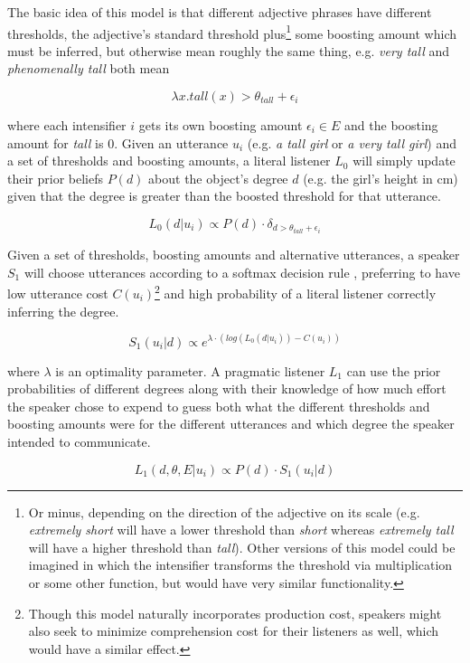 \documentclass[10pt,letterpaper]{article}
\newcommand{\w}[1]{\emph{#1}}
\begin{document}
The basic idea of this model is that different adjective phrases have different thresholds, the adjective's standard threshold plus\footnote{Or minus, depending on the direction of the adjective on its scale (e.g. \w{extremely short} will have a lower threshold than \w{short} whereas \w{extremely tall} will have a higher threshold than \w{tall}). Other versions of this model could be imagined in which the intensifier transforms the threshold via multiplication or some other function, but would have very similar functionality.} some boosting amount which must be inferred, but otherwise mean roughly the same thing, e.g. \w{very tall} and \w{phenomenally tall} both mean

\[ \lambda x . tall(x) > \theta_{tall} + \epsilon_i \]

where each intensifier $i$ gets its own boosting amount $\epsilon_i \in E$ and the boosting amount for \w{tall} is 0. 
Given an utterance $u_i$ (e.g. \w{a tall girl} or \w{a very tall girl}) and a set of thresholds and boosting amounts, a literal listener $L_0$ will simply update their prior beliefs $P(d)$ about the object's degree $d$ (e.g. the girl's height in cm) given that the degree is greater than the boosted threshold for that utterance.

\[ L_0(d | u_i) \propto P(d) \cdot \delta_{d > \theta_{tall} + \epsilon_i } \]

Given a set of thresholds, boosting amounts and alternative utterances, a speaker $S_1$ will choose utterances according to a softmax decision rule \cite{sutton}, preferring to have low utterance cost $C(u_i)$\footnote{Though this model naturally incorporates production cost, speakers might also seek to minimize comprehension cost for their listeners as well, which would have a similar effect.}
and high probability of a literal listener correctly inferring the degree.

\[ S_1(u_i | d) \propto e^{\lambda \cdot ( log(L_0(d | u_i)) - C(u_i) )} \]

where $\lambda$ is an optimality parameter. A pragmatic listener $L_1$ can use the prior probabilities of different degrees along with their knowledge of how much effort the speaker chose to expend to guess both what the different thresholds and boosting amounts were for the different utterances and which degree the speaker intended to communicate.

\[ L_1(d, \theta, E | u_i) \propto P(d) \cdot S_1(u_i | d) \]
\end{document}
